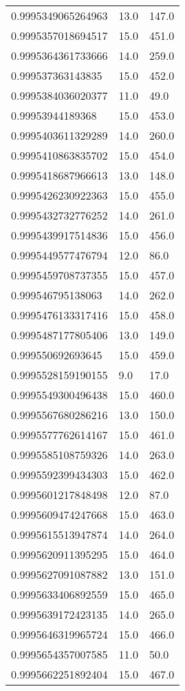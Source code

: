 \begin{center}
\begin{supertabular}[H]{p{0.30\textwidth}p{0.05\textwidth}p{0.05\textwidth}}
0.9995349065264963 & 13.0 & 147.0 \\ 
0.9995357018694517 & 15.0 & 451.0 \\ 
0.9995364361733666 & 14.0 & 259.0 \\ 
0.999537363143835 & 15.0 & 452.0 \\ 
0.9995384036020377 & 11.0 & 49.0 \\ 
0.99953944189368 & 15.0 & 453.0 \\ 
0.9995403611329289 & 14.0 & 260.0 \\ 
0.9995410863835702 & 15.0 & 454.0 \\ 
0.9995418687966613 & 13.0 & 148.0 \\ 
0.9995426230922363 & 15.0 & 455.0 \\ 
0.9995432732776252 & 14.0 & 261.0 \\ 
0.9995439917514836 & 15.0 & 456.0 \\ 
0.9995449577476794 & 12.0 & 86.0 \\ 
0.9995459708737355 & 15.0 & 457.0 \\ 
0.999546795138063 & 14.0 & 262.0 \\ 
0.9995476133317416 & 15.0 & 458.0 \\ 
0.9995487177805406 & 13.0 & 149.0 \\ 
0.999550692693645 & 15.0 & 459.0 \\ 
0.9995528159190155 & 9.0 & 17.0 \\ 
0.9995549300496438 & 15.0 & 460.0 \\ 
0.9995567680286216 & 13.0 & 150.0 \\ 
0.9995577762614167 & 15.0 & 461.0 \\ 
0.9995585108759326 & 14.0 & 263.0 \\ 
0.9995592399434303 & 15.0 & 462.0 \\ 
0.9995601217848498 & 12.0 & 87.0 \\ 
0.9995609474247668 & 15.0 & 463.0 \\ 
0.9995615513947874 & 14.0 & 264.0 \\ 
0.9995620911395295 & 15.0 & 464.0 \\ 
0.9995627091087882 & 13.0 & 151.0 \\ 
0.9995633406892559 & 15.0 & 465.0 \\ 
0.9995639172423135 & 14.0 & 265.0 \\ 
0.9995646319965724 & 15.0 & 466.0 \\ 
0.9995654357007585 & 11.0 & 50.0 \\ 
0.9995662251892404 & 15.0 & 467.0 \\ 

\end{supertabular}
\end{center}
